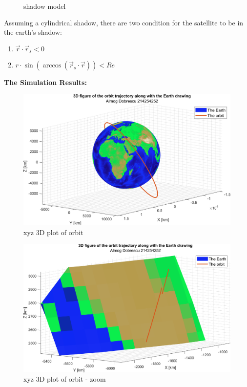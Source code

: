 \documentclass[11pt, a4paper]{article}
\begin{document}
\begin{itemize}
\begin{enumerate}
\begin{figure}[H]
\begin{center}
        \caption{shadow model \cite{SM_Tutorial_10}}
        \end{center}
        \end{figure}
        Assuming a cylindrical shadow, there are two condition for the satellite to be in the earth's shadow:
        \begin{enumerate}
            \item $\vec{r}\cdot\vec{r}_s < 0$
            \item $r\cdot\sin\left(\arccos\left(\vec{r}_s\cdot\vec{r}\right)\right) < Re$
        \end{enumerate}

    \end{enumerate}
\end{itemize}
\textbf{\Large The Simulation Results:}
\begin{figure}[H]
    \begin{center}
    \includegraphics[width=.8\textwidth]{images/grap1.png}
    \caption{xyz 3D plot of orbit}
    \end{center}
\end{figure}
\begin{figure}[H]
    \begin{center}
    \includegraphics[width=.8\textwidth]{images/grap1.1.png}
    \caption{xyz 3D plot of orbit - zoom}
    \end{center}
\end{figure}
\end{document}
